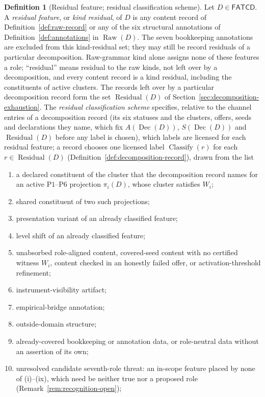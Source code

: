 \documentclass[11pt]{article}
\theoremstyle{definition}
\newtheorem{definition}[theorem]{Definition}
\newcommand{\FATCD}{\ensuremath{\mathsf{FATCD}}}
\newcommand{\Raw}[1]{\ensuremath{\operatorname{Raw}\!\left(#1\right)}}
\newcommand{\Dec}[1]{\ensuremath{\operatorname{Dec}\!\left(#1\right)}}
\newcommand{\Residual}[1]{\ensuremath{\operatorname{Residual}\!\left(#1\right)}}
\newcommand{\Pone}{\ensuremath{\mathrm{P1}}}
\newcommand{\Psix}{\ensuremath{\mathrm{P6}}}
\begin{document}
\begin{definition}[Residual feature; residual classification scheme]\label{def:residual-scheme}
Let \(D \in \FATCD{}\). A \emph{residual feature}, or \emph{kind residual}, of \(D\) is
any content record of Definition~\ref{def:raw-record} or any of the six
structural annotations of Definition~\ref{def:annotations} in \(\Raw{D}\). The
seven bookkeeping annotations are excluded from this kind-residual set; they
may still be record residuals of a particular decomposition. Raw-grammar kind
alone assigns none of these features a role; ``residual'' means residual to
the raw kinds, not left over by a decomposition, and every content record is a
kind residual, including the constituents of active clusters. The records left
over by a particular decomposition record form the set \(\Residual{D}\) of
Section~\ref{sec:decomposition-exhaustion}. The \emph{residual classification scheme}
specifies, relative to the channel entries of a decomposition record (its six
statuses and the clusters, offers, seeds and declarations they name, which fix
\(A(\Dec{D})\), \(S(\Dec{D})\) and \(\Residual{D}\) before any label is chosen),
which labels are licensed for each residual feature; a record chooses one licensed label
\(\operatorname{Classify}(r)\) for each \(r\in\Residual{D}\)
(Definition~\ref{def:decomposition-record}), drawn from the list
\begin{enumerate}[label=(\roman*),topsep=2pt,itemsep=1pt]
  \item a declared constituent of the cluster that the decomposition record
    names for an active \Pone{}--\Psix{} projection \(\pi_i(D)\), whose
    cluster satisfies \(W_i\);
  \item shared constituent of two such projections;
  \item presentation variant of an already classified feature;
  \item level shift of an already classified feature;
  \item unabsorbed role-aligned content, covered-seed content with no
    certified witness \(W_i\), content checked in an honestly failed offer, or activation-threshold refinement;
  \item instrument-visibility artifact;
  \item empirical-bridge annotation;
  \item outside-domain structure;
  \item already-covered bookkeeping or annotation data, or role-neutral data
    without an assertion of its own;
  \item unresolved candidate seventh-role threat: an in-scope feature placed by none of (i)--(ix), which need be neither true nor a proposed role (Remark~\ref{rem:recognition-open});

\end{enumerate}
\end{definition}
\end{document}
